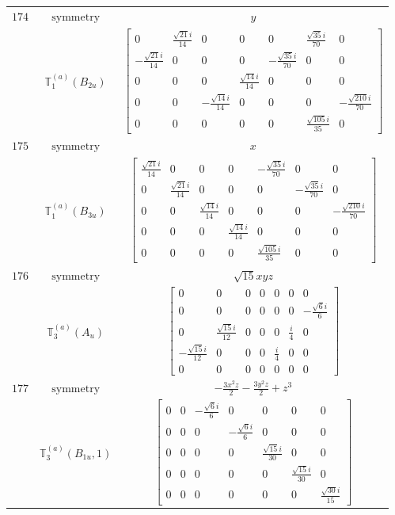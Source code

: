 \documentclass[fleqn,8pt,landscape]{jsarticle}
\begin{document}
\begin{longtable}{ccc}
$ 174 $ & $ \text{symmetry} $ & $ y $ \\
$  $ & $ \mathbb{T}_{1}^{(a)}(B_{2u}) $ & $ \begin{bmatrix} 0 & \frac{\sqrt{21} i}{14} & 0 & 0 & 0 & \frac{\sqrt{35} i}{70} & 0 \\ - \frac{\sqrt{21} i}{14} & 0 & 0 & 0 & - \frac{\sqrt{35} i}{70} & 0 & 0 \\ 0 & 0 & 0 & \frac{\sqrt{14} i}{14} & 0 & 0 & 0 \\ 0 & 0 & - \frac{\sqrt{14} i}{14} & 0 & 0 & 0 & - \frac{\sqrt{210} i}{70} \\ 0 & 0 & 0 & 0 & 0 & \frac{\sqrt{105} i}{35} & 0 \end{bmatrix} $ \\ \hline
$ 175 $ & $ \text{symmetry} $ & $ x $ \\
$  $ & $ \mathbb{T}_{1}^{(a)}(B_{3u}) $ & $ \begin{bmatrix} \frac{\sqrt{21} i}{14} & 0 & 0 & 0 & - \frac{\sqrt{35} i}{70} & 0 & 0 \\ 0 & \frac{\sqrt{21} i}{14} & 0 & 0 & 0 & - \frac{\sqrt{35} i}{70} & 0 \\ 0 & 0 & \frac{\sqrt{14} i}{14} & 0 & 0 & 0 & - \frac{\sqrt{210} i}{70} \\ 0 & 0 & 0 & \frac{\sqrt{14} i}{14} & 0 & 0 & 0 \\ 0 & 0 & 0 & 0 & \frac{\sqrt{105} i}{35} & 0 & 0 \end{bmatrix} $ \\ \hline
$ 176 $ & $ \text{symmetry} $ & $ \sqrt{15} x y z $ \\
$  $ & $ \mathbb{T}_{3}^{(a)}(A_{u}) $ & $ \begin{bmatrix} 0 & 0 & 0 & 0 & 0 & 0 & 0 \\ 0 & 0 & 0 & 0 & 0 & 0 & - \frac{\sqrt{6} i}{6} \\ 0 & \frac{\sqrt{15} i}{12} & 0 & 0 & 0 & \frac{i}{4} & 0 \\ - \frac{\sqrt{15} i}{12} & 0 & 0 & 0 & \frac{i}{4} & 0 & 0 \\ 0 & 0 & 0 & 0 & 0 & 0 & 0 \end{bmatrix} $ \\ \hline
$ 177 $ & $ \text{symmetry} $ & $ - \frac{3 x^{2} z}{2} - \frac{3 y^{2} z}{2} + z^{3} $ \\
$  $ & $ \mathbb{T}_{3}^{(a)}(B_{1u},1) $ & $ \begin{bmatrix} 0 & 0 & - \frac{\sqrt{6} i}{6} & 0 & 0 & 0 & 0 \\ 0 & 0 & 0 & - \frac{\sqrt{6} i}{6} & 0 & 0 & 0 \\ 0 & 0 & 0 & 0 & \frac{\sqrt{15} i}{30} & 0 & 0 \\ 0 & 0 & 0 & 0 & 0 & \frac{\sqrt{15} i}{30} & 0 \\ 0 & 0 & 0 & 0 & 0 & 0 & \frac{\sqrt{30} i}{15} \end{bmatrix} $ \\ \hline

\end{longtable}
\end{document}
